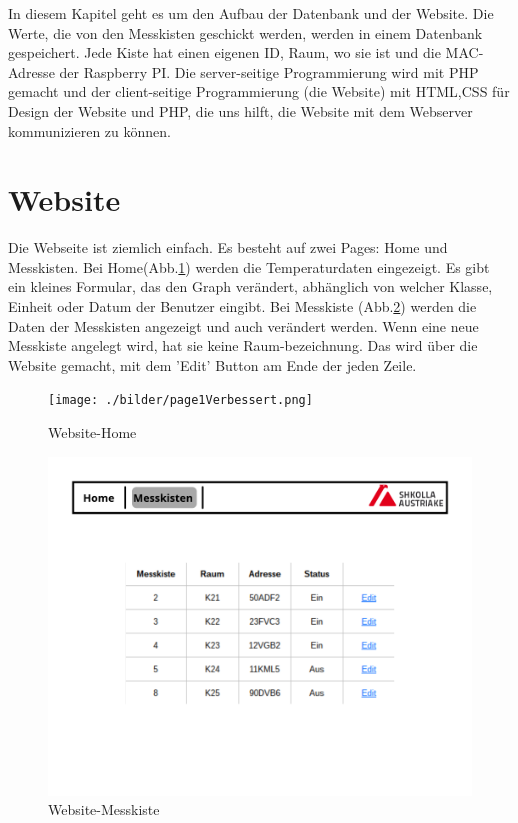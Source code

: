 \pagestyle{fancy}
In diesem Kapitel geht es um den Aufbau der Datenbank und der Website.
Die Werte, die von den Messkisten geschickt werden, werden in einem Datenbank gespeichert. Jede Kiste hat einen eigenen ID, Raum, wo sie ist und die MAC-Adresse der Raspberry PI. Die server-seitige Programmierung wird mit PHP gemacht und der client-seitige Programmierung (die Website) mit HTML,CSS f\"ur Design der Website und PHP, die uns hilft, die Website mit dem Webserver kommunizieren zu k\"onnen. 
	\section{Website}
	Die Webseite ist ziemlich einfach. Es besteht auf zwei Pages: Home und Messkisten. 
	Bei Home(Abb.\ref{fi:Web1}) werden die Temperaturdaten eingezeigt. Es gibt ein kleines Formular, das den Graph ver\"andert, abh\"anglich von welcher Klasse, Einheit oder Datum der Benutzer eingibt.	
	Bei Messkiste (Abb.\ref{fi:Web2}) werden die Daten der Messkisten angezeigt und auch ver\"andert werden. Wenn eine neue Messkiste angelegt wird, hat sie keine Raum-bezeichnung. Das wird \"uber die Website gemacht, mit dem 'Edit' Button am Ende der jeden Zeile. 
		\begin{figure}[ht]
		\centering
		\texttt{[image: ./bilder/page1Verbessert.png]}
		\caption{Website-Home}
		\label{fi:Web1}
		\end{figure} 
	\begin{figure}[ht]
		\centering
		\includegraphics[scale=0.4]{./bilder/Page_2.png}
		\caption{Website-Messkiste}
		\label{fi:Web2}
	\end{figure} 
